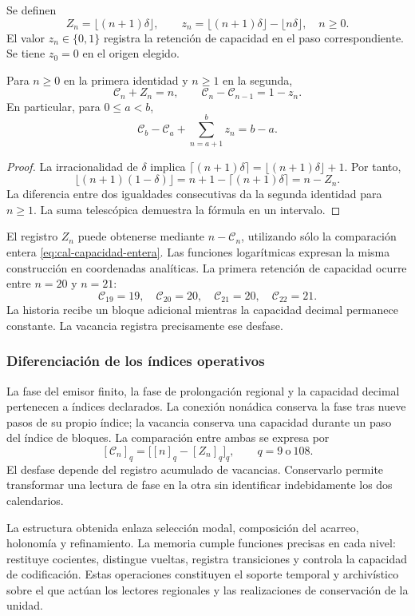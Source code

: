 \begin{definicion}
Se definen
\[
 Z_n=\lfloor(n+1)\delta\rfloor,\qquad
 z_n=\lfloor(n+1)\delta\rfloor-\lfloor n\delta\rfloor,
 \quad n\geq0.
\]
El valor $z_n\in\{0,1\}$ registra la retención de capacidad en el
paso correspondiente. Se tiene $z_0=0$ en el origen elegido.
\end{definicion}

\begin{teorema}
\label{thm:cal-capacidad}
Para $n\geq0$ en la primera identidad y $n\geq1$ en la segunda,
\begin{equation}
 \mathcal C_n+Z_n=n,
 \qquad \mathcal C_n-\mathcal C_{n-1}=1-z_n.
 \label{eq:cal-capacidad}
\end{equation}
En particular, para $0\leq a<b$,
\[
 \mathcal C_b-\mathcal C_a+\sum_{n=a+1}^{b}z_n=b-a.
\]
\end{teorema}
\begin{proof}
La irracionalidad de $\delta$ implica
$\lceil(n+1)\delta\rceil=\lfloor(n+1)\delta\rfloor+1$.
Por tanto,
\[
 \lfloor(n+1)(1-\delta)\rfloor
 =n+1-\lceil(n+1)\delta\rceil=n-Z_n.
\]
La diferencia entre dos igualdades consecutivas da la segunda identidad
para $n\geq1$. La suma telescópica demuestra la fórmula en un intervalo.
\end{proof}

El registro $Z_n$ puede obtenerse mediante $n-\mathcal C_n$,
utilizando sólo la comparación entera
\eqref{eq:cal-capacidad-entera}. Las funciones logarítmicas expresan
la misma construcción en coordenadas analíticas. La primera retención
de capacidad ocurre entre $n=20$ y $n=21$:
\[
 \mathcal C_{19}=19,\quad\mathcal C_{20}=20,\quad
 \mathcal C_{21}=20,\quad\mathcal C_{22}=21.
\]
La historia recibe un bloque adicional mientras la capacidad decimal
permanece constante. La vacancia registra precisamente ese desfase.

\subsubsection{Diferenciación de los índices operativos}

La fase del emisor finito, la fase de prolongación regional y la capacidad
decimal pertenecen a índices declarados. La conexión nonádica conserva
la fase tras nueve pasos de su propio índice; la vacancia conserva una
capacidad durante un paso del índice de bloques. La comparación entre
ambas se expresa por
\[
 [\mathcal C_n]_q=\bigl[[n]_q-[Z_n]_q\bigr]_q,
 \qquad q=9\ \text{o}\ 108.
\]
El desfase depende del registro acumulado de vacancias. Conservarlo
permite transformar una lectura de fase en la otra sin identificar
indebidamente los dos calendarios.

La estructura obtenida enlaza selección modal, composición del acarreo,
holonomía y refinamiento. La memoria cumple funciones precisas en cada
nivel: restituye cocientes, distingue vueltas, registra transiciones y
controla la capacidad de codificación. Estas operaciones constituyen el
soporte temporal y archivístico sobre el que actúan los lectores regionales
y las realizaciones de conservación de la unidad.
